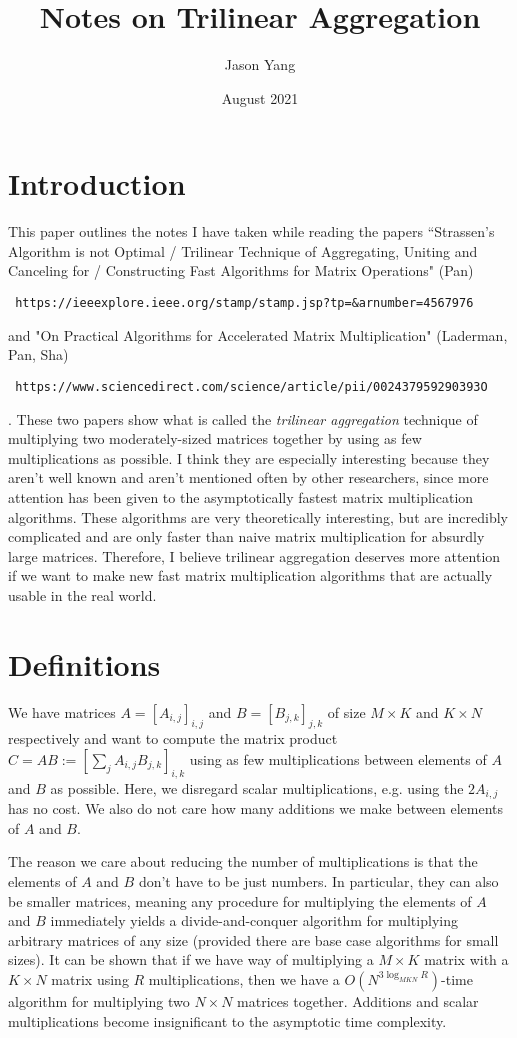 \documentclass{article}
\title{Notes on Trilinear Aggregation}
\author{Jason Yang}
\date{August 2021}
\begin{document}
\maketitle

\section{Introduction}

This paper outlines the notes I have taken while reading the papers ``Strassen's Algorithm is not Optimal / Trilinear Technique of Aggregating, Uniting and Canceling for / Constructing Fast Algorithms for Matrix Operations" (Pan) \begin{verbatim} https://ieeexplore.ieee.org/stamp/stamp.jsp?tp=&arnumber=4567976 \end{verbatim} and "On Practical Algorithms for Accelerated Matrix Multiplication" (Laderman, Pan, Sha) \begin{verbatim} https://www.sciencedirect.com/science/article/pii/002437959290393O \end{verbatim}. These two papers show what is called the \textit{trilinear aggregation} technique of multiplying two moderately-sized matrices together by using as few multiplications as possible. I think they are especially interesting because they aren't well known and aren't mentioned often by other researchers, since more attention has been given to the asymptotically fastest matrix multiplication algorithms. These algorithms are very theoretically interesting, but are incredibly complicated and are only faster than naive matrix multiplication for absurdly large matrices. Therefore, I believe trilinear aggregation deserves more attention if we want to make new fast matrix multiplication algorithms that are actually usable in the real world.

\section{Definitions}

We have matrices $A=[A_{i,j}]_{i,j}$ and $B=[B_{j,k}]_{j,k}$ of size $M\times K$ and $K\times N$ respectively and want to compute the matrix product $C=AB:=[\sum_{j} A_{i,j}B_{j,k}]_{i,k}$ using as few multiplications between elements of $A$ and $B$ as possible. Here, we disregard scalar multiplications, e.g. using the $2A_{i,j}$ has no cost. We also do not care how many additions we make between elements of $A$ and $B$.

The reason we care about reducing the number of multiplications is that the elements of $A$ and $B$ don't have to be just numbers. In particular, they can also be smaller matrices, meaning any procedure for multiplying the elements of $A$ and $B$ immediately yields a divide-and-conquer algorithm for multiplying arbitrary matrices of any size (provided there are base case algorithms for small sizes). It can be shown that if we have way of multiplying a $M\times K$ matrix with a $K\times N$ matrix using $R$ multiplications, then we have a $O(N^{3\log_{MKN} R})$-time algorithm for multiplying two $N\times N$ matrices together. Additions and scalar multiplications become insignificant to the asymptotic time complexity.
\end{document}
